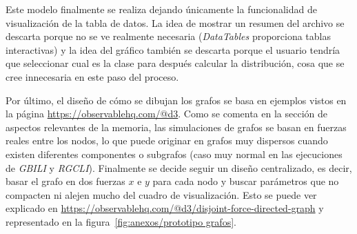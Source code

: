 Este modelo finalmente se realiza dejando únicamente la funcionalidad de visualización de la tabla de datos. La idea de mostrar un resumen del archivo se descarta porque no se ve realmente necesaria (\textit{DataTables} proporciona tablas interactivas) y la idea del gráfico también se descarta porque el usuario tendría que seleccionar cual es la clase para después calcular la distribución, cosa que se cree innecesaria en este paso del proceso.

Por último, el diseño de cómo se dibujan los grafos se basa en ejemplos vistos en la página \url{https://observablehq.com/@d3}. Como se comenta en la sección de aspectos relevantes de la memoria, las simulaciones de grafos se basan en fuerzas reales entre los nodos, lo que puede originar en grafos muy dispersos cuando existen diferentes componentes o subgrafos (caso muy normal en las ejecuciones de \textit{GBILI} y \textit{RGCLI}). Finalmente se decide seguir un diseño centralizado, es decir, basar el grafo en dos fuerzas $x$ e $y$ para cada nodo y buscar parámetros que no compacten ni alejen mucho del cuadro de visualización. Esto se puede ver explicado en \url{https://observablehq.com/@d3/disjoint-force-directed-graph} y representado en la figura~\ref{fig:anexos/prototipo grafos}.





